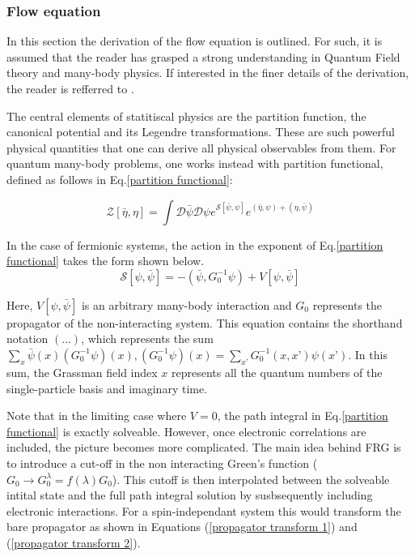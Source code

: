 \documentclass[12pt]{article}
\begin{document}
\subsubsection{Flow equation}
\label{subsubsec:Flow Equation}

In this section the derivation of the flow equation is outlined. For such, it is assumed that the reader has grasped a strong understanding in Quantum Field theory and many-body physics.
If interested in the finer details of the derivation, the reader is refferred to \cite{metzner2012functional}. \par
\medskip
\noindent The central elements of statitiscal physics are the partition function, the canonical potential and its Legendre transformations. 
These are such powerful physical quantities that one can derive all physical observables from them.
For quantum many-body problems, one works instead with partition functional, defined as follows in Eq.\ref{partition functional}:

\begin{equation}\label{partition functional}
    \mathcal{Z}[\bar{\eta}, \eta] = \int \mathcal{D} \bar{\psi} \mathcal{D}\psi e^{\mathcal{S}[\bar{\psi}, \psi]}e^{(\bar{\eta}, \psi)+(\eta, \bar{\psi})}
\end{equation}

\noindent In the case of fermionic systems, the action in the exponent of Eq.\ref{partition functional} takes the form shown below.
\begin{equation} \label{action}
    \mathcal{S}[\psi, \bar{\psi}] = -(\bar{\psi}, G_0^{-1} \psi) + V[\psi, \bar{\psi}]
\end{equation}

\noindent Here, $V[\psi, \bar{\psi}]$ is an arbitrary many-body interaction and $G_0$ represents the propagator of the non-interacting system. This equation contains the shorthand notation $(...)$, which represents the sum $\sum_x \bar{\psi}(x)(G_0^{-1}\psi)(x), (G_0^{-1}\psi)(x) = \sum_{x’}G_0^{-1}(x,x’)\psi(x’)$. In this sum, the Grassman field index $x$ represents all the quantum numbers of the single-particle basis and imaginary time.\par
\medskip

\noindent Note that in the limiting case where $V=0$, the path integral in Eq.\ref{partition functional} is exactly solveable. 
However, once electronic correlations are included, the picture becomes more complicated. 
The main idea behind FRG is to introduce a cut-off in the non interacting Green's function ($G_0 \rightarrow G_0^{\lambda} = f(\lambda)G_0$). 
This cutoff is then interpolated between the solveable intital state and the full path integral solution by susbsequently including electronic interactions. For a spin-independant system this would transform the 
bare propagator as shown in Equations (\ref{propagator transform 1}) and (\ref{propagator transform 2}). 
\end{document}
